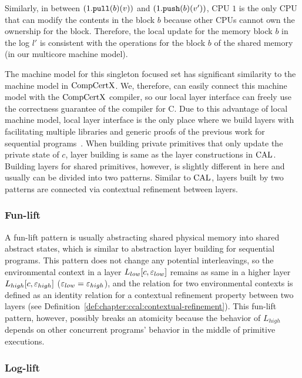 Similarly,  in between $(1.{\mathrm{\texttt{pull}}}(b)(v))$ and $(1.{\mathrm{\texttt{push}}}(b)(v'))$, 
CPU $1$ is the only  CPU that can modify the contents in the block $b$
because other CPUs cannot own the ownership for the block.
Therefore, the local update for the memory block $b$ in the log $l'$ 
is consistent with the operations for the block $b$ of the shared memory (in our multicore machine model).


The machine model for this singleton focused set has significant similarity to the machine model in $\mathrm{CompCertX}$. 
We, therefore, can easily connect this machine model with the $\mathrm{CompCertX}$ compiler, 
so our local layer interface can freely use the correctness guarantee of the compiler for C. 
Due to this advantage of local machine model, local layer interface is the only place where we build layers with facilitating multiple libraries and generic proofs of the previous work for sequential programs~\cite{deepspec}. 
When building private primitives that only update the private state of $c$, 
layer building is same as the layer constructions in $\mathrm{CAL}$.
Building layers for shared primitives, however, is slightly different in here and usually can be divided into 
two patterns. 
Similar to $\mathrm{CAL}$, layers built by two patterns are connected via contextual refinement between layers. 

\subsubsection{Fun-lift}
A fun-lift pattern is usually abstracting shared physical memory into shared abstract states,
which is similar to  abstraction layer building for sequential programs.
This pattern does not change any potential interleavings, 
so the environmental context in a layer $L_{low}[c, {\varepsilon}_{low}]$ remains 
as same in a higher layer $L_{high}[c, {\varepsilon}_{high}]$ (${\varepsilon}_{low} = {\varepsilon}_{high}$), and the 
relation for two environmental contexts is defined as an identity relation 
for a contextual refinement property between two layers (see Definition~\ref{def:chapter:ccal:contextual-refinement}).
This fun-lift pattern, however, possibly breaks an atomicity because the behavior of $L_{high}$ depends on other concurrent programs’ behavior in the middle of  primitive executions. 

\subsubsection{Log-lift}


